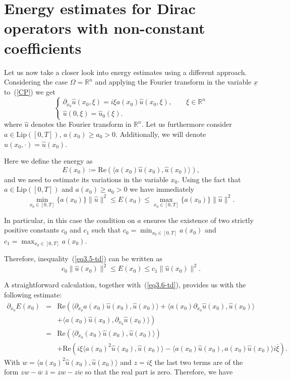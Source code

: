 \documentclass[12pt]{amsart}
\theoremstyle{definition}
\newcommand{\R}{\mathbb{R}}
\newcommand{\un}{\underline}
\begin{document}
\section{Energy estimates for Dirac operators with non-constant coefficients}

Let us now take a closer look into energy estimates using a different approach. Considering the case $\Omega=\R^n$ and applying the Fourier transform in the variable $\un{x}$ to~(\ref{CP}) we get
\begin{equation}
\begin{cases}
\partial_{x_0}\hat{u}(x_0,\xi) = i\xi a(x_0)\hat{u}(x_0,\xi), \qquad \xi\in\R^n\\
\hat{u}(0,\xi) = \hat{u}_0(\xi).
\end{cases}
\label{eq3.4-td}
\end{equation}
where $\hat{u}$ denotes the Fourier transform in $\R^n$. Let us furthermore consider $a \in \text{Lip}([0, T]), \, a(x_0) \geq a_0 > 0$. Additionally, we will denote $\hat{u}(x_0,\cdot)=\hat{u}(x_0)$.

Here we define the energy as
\[
E(x_0) := \mathrm{Re}\left(\langle a(x_0)\hat{u}(x_0), \hat{u}(x_0) \rangle\right),
\]
and we need to estimate its variations in the variable $x_0$. Using the fact that $a \in \text{Lip}([0, T])$ and $a(x_0) \geq a_0 > 0$ we have immediately
\begin{equation}
\min_{x_0 \in [0,T]} \{a(x_0)\}\|\hat{u}\|^2\leq E(x_0) \leq \max_{x_0 \in [0,T]} \{a(x_0)\} \|\hat{u}\|^2 .
\label{eq3.5-td}
\end{equation}

In particular, in this case the condition on $a$ ensures the existence of two strictly positive constants $c_0 $ and $ c_1 $ such that $ c_0 = \min_{x_0 \in [0,T]} a(x_0) $ and $ c_1 = \max_{x_0 \in [0,T]} a(x_0) $.

Therefore, inequality~(\ref{eq3.5-td}) can be written as
\begin{equation}
c_0 \|\hat{u}(x_0)\|^2 \leq E(x_0) \leq c_1 \|\hat{u}(x_0)\|^2.
\label{eq3.6-td}
\end{equation}

A straightforward calculation, together with~(\ref{eq3.6-td}), provides us with the following estimate:
\begin{eqnarray*}
\partial_{x_0}E(x_0) & = & \mathrm{Re}\left(\langle \partial_{x_0}a(x_0)\hat{u}(x_0), \hat{u}(x_0) \rangle + \langle a(x_0)\partial_{x_0}\hat{u}(x_0), \hat{u}(x_0)\right. \rangle\\
&&  \left. + \langle a(x_0)\hat{u}(x_0), \partial_{x_0}\hat{u}(x_0) \rangle \right)\\
& = & \mathrm{Re}\left(\langle \partial_{x_0}(x_0)\hat{u}(x_0), \hat{u}(x_0) \rangle \right)\\
&& +  \mathrm{Re}\left(i\xi\langle a(x_0)^2\hat{u}(x_0), \hat{u}(x_0) \rangle - \langle a(x_0)\hat{u}(x_0), a(x_0)\hat{u}(x_0) \rangle i\overline{\xi}\right).
\end{eqnarray*}
With $w=\langle a(x_0)^2\hat{u}(x_0), \hat{u}(x_0) \rangle$ and $z=i\xi$ the last two terms are of the form $zw-\overline{w}\;\overline{z}=zw-\overline{zw}$ so that the real part is zero. Therefore, we have
\end{document}
